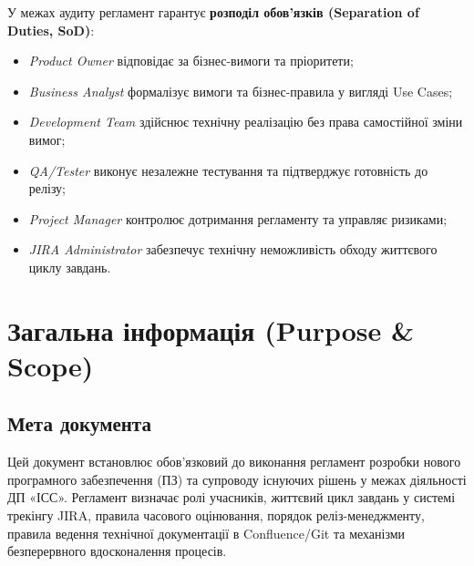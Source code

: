 \documentclass{article}
\begin{document}
У межах аудиту регламент гарантує \textbf{розподіл обов'язків (Separation of Duties, SoD)}:
\begin{itemize}
    \item \emph{Product Owner} відповідає за бізнес-вимоги та пріоритети;
    \item \emph{Business Analyst} формалізує вимоги та бізнес-правила у вигляді Use Cases;
    \item \emph{Development Team} здійснює технічну реалізацію без права самостійної зміни вимог;
    \item \emph{QA/Tester} виконує незалежне тестування та підтверджує готовність до релізу;
    \item \emph{Project Manager} контролює дотримання регламенту та управляє ризиками;
    \item \emph{JIRA Administrator} забезпечує технічну неможливість обходу життєвого циклу завдань.
\end{itemize}

\newpage

\section{Загальна інформація (Purpose \& Scope)}

\subsection{Мета документа}
Цей документ встановлює обов'язковий до виконання регламент розробки нового програмного забезпечення (ПЗ) та супроводу існуючих рішень у межах діяльності ДП «ІСС». Регламент визначає ролі учасників, життєвий цикл завдань у системі трекінгу JIRA, правила часового оцінювання, порядок реліз-менеджменту, правила ведення технічної документації в Confluence/Git та механізми безперервного вдосконалення процесів.
\end{document}
